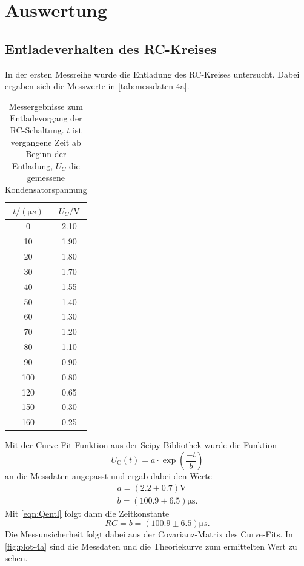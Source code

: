\section{Auswertung}
\label{sec:Auswertung}

\subsection{Entladeverhalten des RC-Kreises}
\label{sec:4a-auswertung}

In der ersten Messreihe wurde die Entladung des RC-Kreises untersucht. Dabei ergaben sich
die Messwerte in \autoref{tab:messdaten-4a}.

\begin{table}
	\centering
	\caption{Messergebnisse zum Entladevorgang der RC-Schaltung. $t$ ist vergangene Zeit 
	ab Beginn der Entladung, $U_C$ die gemessene Kondensatorspannung}
	\label{tab:messdaten-4a}
	\begin{tabular}{c c}
		\toprule
		$t / (\si{\micro s})$ & $U_C / \si{\volt}$ \\
		\midrule
		0  	&2.10 \\
		10  	&1.90 \\
		20  	&1.80 \\
		30  	&1.70 \\
		40  	&1.55 \\
		50  	&1.40 \\
		60  	&1.30 \\
		70  	&1.20 \\
		80  	&1.10 \\
		90  	&0.90 \\
		100  	&0.80 \\
		120  	&0.65 \\
		150  	&0.30 \\
		160  	&0.25 \\
		\bottomrule
	\end{tabular}
\end{table}

Mit der Curve-Fit Funktion aus der Scipy-Bibliothek wurde die Funktion
\begin{equation}
	U_\text{C}(t) = a \cdot \exp\left(\frac{-t}{b}\right)
\end{equation}
an die Messdaten angepasst und ergab dabei den Werte
\begin{align}
	a = (2.2 \pm 0.7) \si{\volt} \label{eqn:result4a-1} \\
	b = (100.9 \pm 6.5) \si{\micro\second}. \label{eqn:result4a-2}
\end{align}
Mit \autoref{eqn:Qentl} folgt dann die Zeitkonstante
\begin{equation}
	RC = b = (100.9 \pm 6.5) \si{\micro s}.
	\label{eqn:ergebnis-4a}
\end{equation}
Die Messunsicherheit folgt dabei aus der Covarianz-Matrix des Curve-Fits.
In \autoref{fig:plot-4a} sind die Messdaten und die Theoriekurve zum ermittelten Wert zu sehen.

